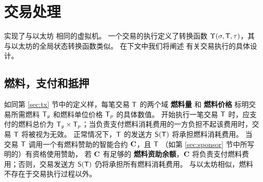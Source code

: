 

\section{交易处理}
\label{sec:tx_processing}

\name 实现了与以太坊 \cite{ETH_yellow} 相同的虚拟机。
一个交易的执行定义了转换函数 $\Upsilon(\mathbf{\sigma},\textsf{T},\tau)$，其与以太坊的全局状态转换函数类似。
在下文中我们将阐述 \name 有关交易执行的具体设计。

\subsection{燃料，支付和抵押}
\label{subsec:gas_and_pay}

如同第 \ref{sec:tx} 节中的定义样，每笔交易 $\textsf{T}$ 的两个域 {\bf 燃料量} 和 {\bf 燃料价格} 标明交易所需燃料 $\textsf{T}_g$ 和燃料单位价格 $\textsf{T}_p$ 的具体数值。
开始执行一笔交易 $\textsf{T}$ 时，应支付的燃料总价为 $\textsf{T}_g \times \textsf{T}_p$；当负责支付燃料消耗费用的一方负担不起该费用时，交易 $\textsf{T}$ 将被视为无效。
正常情况下，$\textsf{T}$ 的发送方 $\mathsf{S}{\left({\textsf{T}} \right)}$ 将承担燃料消耗费用。
当交易 $\textsf{T}$ 调用一个有燃料赞助的智能合约 $\mathbf{C}$，且 $\textsf{T}$ （如第 \ref{sec:sponsor} 节中所写明的）有资格使用赞助，
若 $\mathbf{C}$ 有足够的 \textbf{燃料资助余额}，$\mathbf{C}$ 将负责支付燃料费用；否则，交易发送方 $\mathsf{S}{\left({\textsf{T}} \right)}$ 仍将承担所有燃料消耗费用。
与以太坊相似，燃料不存在于交易执行过程以外。


